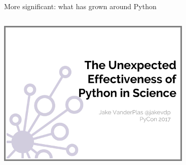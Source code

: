 \documentclass[aspectratio=169]{beamer}
\begin{document}
\begin{frame}{More significant: what has grown around Python}
\begin{columns}[b]

\includegraphics[width=\linewidth]{unreasonable-effectiveness.png}
\vspace{5.3 cm}
\end{columns}
\end{frame}
\end{document}
